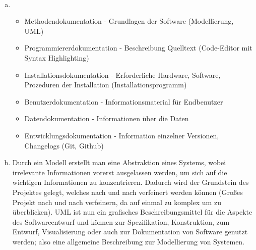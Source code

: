         \begin{loesung}\:
            \\[-.7cm]\begin{enumerate}[(a)]
                \setlength\itemsep{0.1px}
                \item 
                \begin{itemize}
                    \setlength\itemsep{0.1px}
                    \item Methodendokumentation - Grundlagen der Software (Modellierung, UML)
                    \item Programmiererdokumentation - Beschreibung Quelltext (Code-Editor mit Syntax Highlighting)
                    \item Installationsdokumentation - Erforderliche Hardware, Software, Prozeduren der Installation (Installationsprogramm)
                    \item Benutzerdokumentation - Informationsmaterial für Endbenutzer
                    \item Datendokumentation - Informationen über die Daten
                    \item Entwicklungsdokumentation - Information einzelner Versionen, Changelogs (Git, Github)
                \end{itemize}
                \item Durch ein Modell erstellt man eine Abstraktion eines Systems, wobei irrelevante Informationen vorerst ausgelassen werden, um sich auf die wichtigen Informationen zu konzentrieren. Dadurch wird der Grundstein des Projektes gelegt, welches nach und nach verfeinert werden können (Großes Projekt nach und nach verfeinern, da auf einmal zu komplex um zu überblicken). UML ist nun ein grafisches Beschreibungsmittel für die Aspekte des Softwareentwurf und können zur Spezifikation, Konstruktion, zum Entwurf, Visualisierung oder auch zur Dokumentation von Software genutzt werden; also eine allgemeine Beschreibung zur Modellierung von Systemen.
            \end{enumerate}
        \end{loesung}
	
